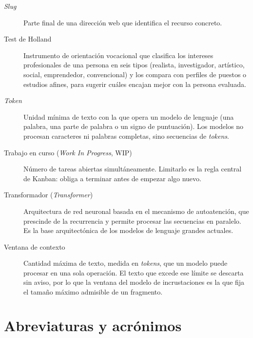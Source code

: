 \begin{description}
  \item[\textit{Slug}] Parte final de una dirección web que identifica el
        recurso concreto.
        
  \item[Test de Holland] Instrumento de
        orientación vocacional que clasifica los intereses profesionales de una
        persona en seis tipos (realista, investigador, artístico, social,
        emprendedor, convencional) y los compara con perfiles de puestos o
        estudios afines, para sugerir cuáles encajan mejor con la persona
        evaluada.
        
  \item[\textit{Token}] Unidad mínima de texto con la que opera un modelo de
        lenguaje (una palabra, una parte de palabra o un signo de puntuación). Los
        modelos no procesan caracteres ni palabras completas, sino secuencias de
        \textit{tokens}.
        
  \item[Trabajo en curso (\textit{Work In Progress}, WIP)] Número de tareas
        abiertas simultáneamente. Limitarlo es la regla central de Kanban: obliga a
        terminar antes de empezar algo nuevo.
        
  \item[Transformador (\textit{Transformer})] Arquitectura de red neuronal
        basada en el mecanismo de autoatención, que prescinde de la recurrencia y
        permite procesar las secuencias en paralelo. Es la base arquitectónica de
        los modelos de lenguaje grandes actuales.
        
  \item[Ventana de contexto] Cantidad máxima de texto,
        medida en \textit{tokens}, que un modelo puede procesar en una sola
        operación. El texto que excede ese límite se descarta sin aviso, por lo que
        la ventana del modelo de incrustaciones es la que fija el tamaño máximo
        admisible de un fragmento.
        
\end{description}

\section{Abreviaturas y acrónimos}

